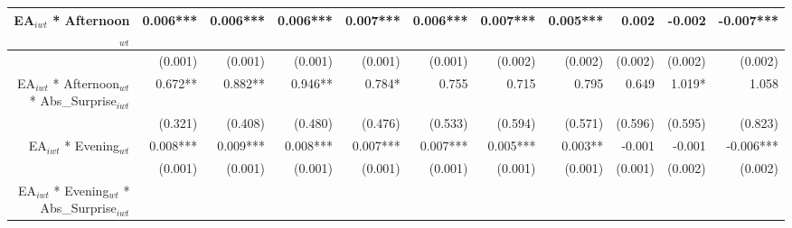 \begin{table}
{\begin{tabular}{rrrrrrrrrrr}
\multicolumn{1}{|r|}{EA$_{iwt}$ * Afternoon$_{wt}$} &
  \multicolumn{1}{r|}{0.006***} &
  \multicolumn{1}{r|}{0.006***} &
  \multicolumn{1}{r|}{0.006***} &
  \multicolumn{1}{r|}{0.007***} &
  \multicolumn{1}{r|}{0.006***} &
  \multicolumn{1}{r|}{0.007***} &
  \multicolumn{1}{r|}{0.005***} &
  \multicolumn{1}{r|}{0.002} &
  \multicolumn{1}{r|}{-0.002} &
  \multicolumn{1}{r|}{-0.007***} \\ \hline
\multicolumn{1}{|r|}{} &
  \multicolumn{1}{r|}{(0.001)} &
  \multicolumn{1}{r|}{(0.001)} &
  \multicolumn{1}{r|}{(0.001)} &
  \multicolumn{1}{r|}{(0.001)} &
  \multicolumn{1}{r|}{(0.001)} &
  \multicolumn{1}{r|}{(0.002)} &
  \multicolumn{1}{r|}{(0.002)} &
  \multicolumn{1}{r|}{(0.002)} &
  \multicolumn{1}{r|}{(0.002)} &
  \multicolumn{1}{r|}{(0.002)} \\ \hline
\multicolumn{1}{|r|}{EA$_{iwt}$ * Afternoon$_{wt}$ * Abs\_Surprise$_{iwt}$} &
  \multicolumn{1}{r|}{0.672**} &
  \multicolumn{1}{r|}{0.882**} &
  \multicolumn{1}{r|}{0.946**} &
  \multicolumn{1}{r|}{0.784*} &
  \multicolumn{1}{r|}{0.755} &
  \multicolumn{1}{r|}{0.715} &
  \multicolumn{1}{r|}{0.795} &
  \multicolumn{1}{r|}{0.649} &
  \multicolumn{1}{r|}{1.019*} &
  \multicolumn{1}{r|}{1.058} \\ \hline
\multicolumn{1}{|r|}{} &
  \multicolumn{1}{r|}{(0.321)} &
  \multicolumn{1}{r|}{(0.408)} &
  \multicolumn{1}{r|}{(0.480)} &
  \multicolumn{1}{r|}{(0.476)} &
  \multicolumn{1}{r|}{(0.533)} &
  \multicolumn{1}{r|}{(0.594)} &
  \multicolumn{1}{r|}{(0.571)} &
  \multicolumn{1}{r|}{(0.596)} &
  \multicolumn{1}{r|}{(0.595)} &
  \multicolumn{1}{r|}{(0.823)} \\ \hline
\multicolumn{1}{|r|}{EA$_{iwt}$ * Evening$_{wt}$} &
  \multicolumn{1}{r|}{0.008***} &
  \multicolumn{1}{r|}{0.009***} &
  \multicolumn{1}{r|}{0.008***} &
  \multicolumn{1}{r|}{0.007***} &
  \multicolumn{1}{r|}{0.007***} &
  \multicolumn{1}{r|}{0.005***} &
  \multicolumn{1}{r|}{0.003**} &
  \multicolumn{1}{r|}{-0.001} &
  \multicolumn{1}{r|}{-0.001} &
  \multicolumn{1}{r|}{-0.006***} \\ \hline
\multicolumn{1}{|r|}{} &
  \multicolumn{1}{r|}{(0.001)} &
  \multicolumn{1}{r|}{(0.001)} &
  \multicolumn{1}{r|}{(0.001)} &
  \multicolumn{1}{r|}{(0.001)} &
  \multicolumn{1}{r|}{(0.001)} &
  \multicolumn{1}{r|}{(0.001)} &
  \multicolumn{1}{r|}{(0.001)} &
  \multicolumn{1}{r|}{(0.001)} &
  \multicolumn{1}{r|}{(0.002)} &
  \multicolumn{1}{r|}{(0.002)} \\ \hline
\multicolumn{1}{|r|}{EA$_{iwt}$ * Evening$_{wt}$ * Abs\_Surprise$_{iwt}$} &

\end{tabular}}
\end{table}
